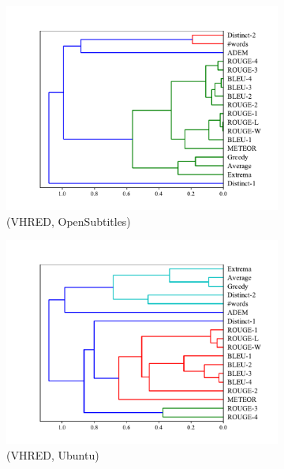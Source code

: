 \begin{figure}[htb]
\begin{subfigure}{0.40\linewidth}
        \includegraphics[width=\linewidth]{figure/plot/hierarchy/v2/pearson/vhred/opensub/plot.pdf}
        \caption{(VHRED, OpenSubtitles)}
    \end{subfigure}%
    \begin{subfigure}{0.40\linewidth}
        \centering
        \includegraphics[width=\linewidth]{figure/plot/hierarchy/v2/pearson/vhred/ubuntu/plot.pdf}
        \caption{(VHRED, Ubuntu)}
    \end{subfigure}
    \begin{subfigure}{0.40\linewidth}
        \centering

\end{subfigure}
\end{figure}
